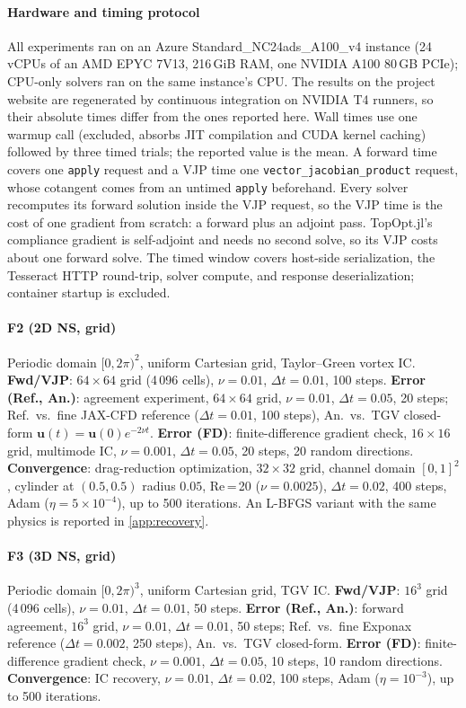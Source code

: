 \documentclass[11pt,a4paper]{article}
\begin{document}
\paragraph{Hardware and timing protocol}
All experiments ran on an Azure Standard\_NC24ads\_A100\_v4 instance
(24 vCPUs of an AMD EPYC 7V13, 216\,GiB RAM, one NVIDIA A100 80\,GB PCIe);
CPU-only solvers ran on the same instance's CPU.
The results on the project website are regenerated by continuous integration
on NVIDIA T4 runners, so their absolute times differ from the ones reported here.
Wall times use one warmup call (excluded, absorbs JIT compilation and CUDA kernel
caching) followed by three timed trials; the reported value is the mean.
A forward time covers one \texttt{apply} request and a VJP time one
\texttt{vector\_jacobian\_product} request, whose cotangent comes from an untimed
\texttt{apply} beforehand. Every solver recomputes its forward solution inside the
VJP request, so the VJP time is the cost of one gradient from scratch: a forward
plus an adjoint pass. TopOpt.jl's compliance gradient is self-adjoint and needs no
second solve, so its VJP costs about one forward solve.
The timed window covers host-side serialization, the Tesseract HTTP round-trip, solver
compute, and response deserialization; container startup is excluded.

\paragraph{F2 (2D NS, grid)}
Periodic domain $[0,2\pi)^2$, uniform Cartesian grid, Taylor--Green vortex IC\@.
\textbf{Fwd/VJP}: $64\times64$ grid (4\,096 cells), $\nu=0.01$, $\Delta t=0.01$, 100 steps.
\textbf{Error (Ref., An.)}: agreement experiment, $64\times64$ grid, $\nu=0.01$,
$\Delta t=0.05$, 20 steps; Ref.\ vs.\ fine JAX-CFD reference ($\Delta t=0.01$, 100 steps),
An.\ vs.\ TGV closed-form $\mathbf{u}(t)=\mathbf{u}(0)e^{-2\nu t}$.
\textbf{Error (FD)}: finite-difference gradient check, $16\times16$ grid, multimode IC,
$\nu=0.001$, $\Delta t=0.05$, 20 steps, 20 random directions.
\textbf{Convergence}: drag-reduction optimization, $32\times32$ grid, channel domain
$[0,1]^2$, cylinder at $(0.5,0.5)$ radius $0.05$, Re\,=\,20 ($\nu=0.0025$),
$\Delta t=0.02$, 400 steps, Adam ($\eta=5\times10^{-4}$), up to 500 iterations.
An L-BFGS variant with the same physics is reported in \cref{app:recovery}.

\paragraph{F3 (3D NS, grid)}
Periodic domain $[0,2\pi)^3$, uniform Cartesian grid, TGV IC\@.
\textbf{Fwd/VJP}: $16^3$ grid (4\,096 cells), $\nu=0.01$, $\Delta t=0.01$, 50 steps.
\textbf{Error (Ref., An.)}: forward agreement, $16^3$ grid, $\nu=0.01$, $\Delta t=0.01$,
50 steps; Ref.\ vs.\ fine Exponax reference ($\Delta t=0.002$, 250 steps),
An.\ vs.\ TGV closed-form.
\textbf{Error (FD)}: finite-difference gradient check, $\nu=0.001$, $\Delta t=0.05$,
10 steps, 10 random directions.
\textbf{Convergence}: IC recovery, $\nu=0.01$, $\Delta t=0.02$, 100 steps,
Adam ($\eta=10^{-3}$), up to 500 iterations.
\end{document}

